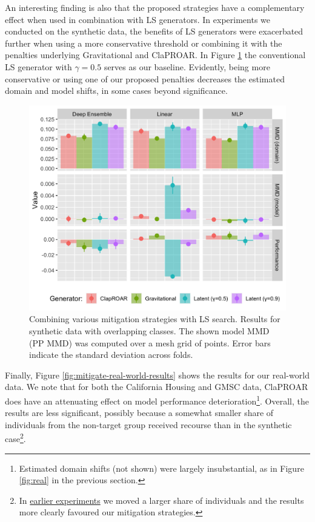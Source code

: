 \documentclass[conference,final,]{IEEEtran}
\theoremstyle{definition}
\theoremstyle{definition}
\theoremstyle{definition}
\theoremstyle{definition}
\theoremstyle{remark}
\begin{document}
An interesting finding is also that the proposed strategies have a complementary effect when used in combination with LS generators. In experiments we conducted on the synthetic data, the benefits of LS generators were exacerbated further when using a more conservative threshold or combining it with the penalties underlying Gravitational and ClaPROAR. In Figure \ref{fig:mitigate-latent-results} the conventional LS generator with \(\gamma=0.5\) serves as our baseline. Evidently, being more conservative or using one of our proposed penalties decreases the estimated domain and model shifts, in some cases beyond significance.

\begin{figure}

{\centering \includegraphics[width=0.9\linewidth]{www/mitigation_synthetic_latent_results} 

}

\caption{Combining various mitigation strategies with LS search. Results for synthetic data with overlapping classes. The shown model MMD (PP MMD) was computed over a mesh grid of points. Error bars indicate the standard deviation across folds.}\label{fig:mitigate-latent-results}
\end{figure}

Finally, Figure \ref{fig:mitigate-real-world-results} shows the results for our real-world data. We note that for both the California Housing and GMSC data, ClaPROAR does have an attenuating effect on model performance deterioration\footnote{Estimated domain shifts (not shown) were largely insubstantial, as in Figure \ref{fig:real} in the previous section.}. Overall, the results are less significant, possibly because a somewhat smaller share of individuals from the non-target group received recourse than in the synthetic case\footnote{In \href{https://github.com/pat-alt/endogenous-macrodynamics-in-algorithmic-recourse/releases/tag/dec-2022}{earlier experiments} we moved a larger share of individuals and the results more clearly favoured our mitigation strategies.}.
\end{document}
